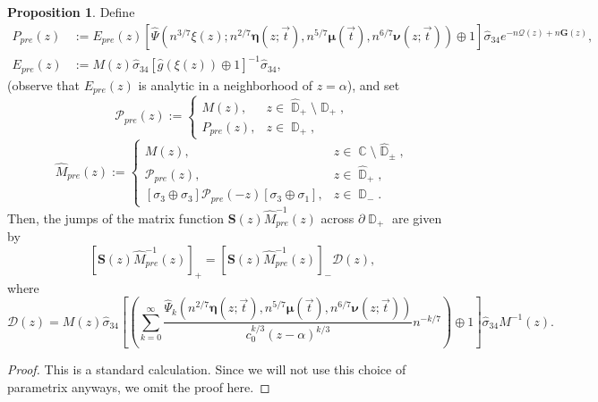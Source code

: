\documentclass[usenames,dvipsnames]{article}
\theoremstyle{definition}
\newtheorem{prop}{Proposition}[section]
\DeclareMathOperator{\CC}{\mathbb{C}}
\DeclareMathOperator{\DD}{\mathbb{D}}
\numberwithin{equation}{section}
\numberwithin{figure}{section}
\begin{document}
\begin{prop}
    Define
        \begin{align}
            P_{pre}(z) &:= E_{pre}(z)\left[\hat{\Psi}(n^{3/7}\xi(z);n^{2/7}\boldsymbol{\eta}(z;\vec{t}),n^{5/7}\boldsymbol{\mu}(\vec{t}),n^{6/7}\boldsymbol{\nu}(z;\vec{t})) \oplus 1\right]\hat{\sigma}_{34} e^{-n\mathcal{Q}(z) + n\boldsymbol{G}(z)},\\
            E_{pre}(z) &:=M(z) \hat{\sigma}_{34}[\hat{g}(\xi(z))\oplus 1]^{-1}\hat{\sigma}_{34},
        \end{align}
    (observe that $E_{pre}(z)$ is analytic in a neighborhood of $z=\alpha$), and set
        \begin{equation}
            \mathcal{P}_{pre}(z) := 
            \begin{cases}
                M(z), & z\in \hat{\DD}_+\setminus \DD_+,\\
                P_{pre}(z), & z\in \DD_+,
            \end{cases}
        \end{equation}
        \begin{equation}
        \hat{M}_{pre}(z) := 
        \begin{cases}
            M(z), & z\in \CC\setminus \hat{\DD}_{\pm},\\
            \mathcal{P}_{pre}(z), & z\in \hat{\DD}_+,\\
            [\sigma_3 \oplus \sigma_3]\mathcal{P}_{pre}(-z)[\sigma_3 \oplus \sigma_1], & z\in \DD_-.
        \end{cases}
    \end{equation}
Then, the jumps of the matrix function $\boldsymbol{S}(z)\hat{M}_{pre}^{-1}(z)$ across $\partial \DD_+$ are given by
    \begin{equation}
        \left[\boldsymbol{S}(z)\hat{M}_{pre}^{-1}(z)\right]_+ = \left[\boldsymbol{S}(z)\hat{M}_{pre}^{-1}(z)\right]_{-} \mathcal{D}(z),
    \end{equation}
where
    \begin{equation}
        \mathcal{D}(z) = M(z)\hat{\sigma}_{34}\left[\left(\sum_{k=0}^{\infty}\frac{\hat{\Psi}_k(n^{2/7}\boldsymbol{\eta}(z;\vec{t}),n^{5/7}\boldsymbol{\mu}(\vec{t}),n^{6/7}\boldsymbol{\nu}(z;\vec{t}))}{c_0^{k/3}(z-\alpha)^{k/3}} n^{-k/7}\right)\oplus 1\right]\hat{\sigma}_{34}M^{-1}(z).
    \end{equation}
\end{prop}
\begin{proof}
    This is a standard calculation. Since we will not use this choice of parametrix anyways, we omit the proof here.
\end{proof}
\end{document}
